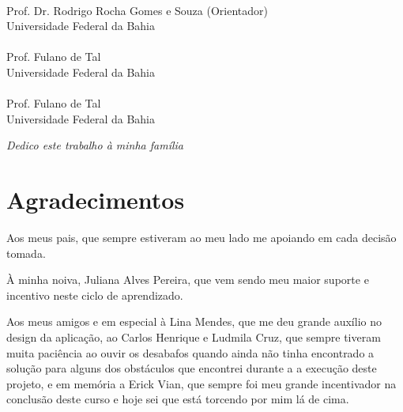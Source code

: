 \documentclass[12pt, a4paper]{report}
\begin{document}
\begin{flushright}
\begin{minipage}[l]{12cm}
\begin{center}
\uline{\hspace{10.5cm}} \\
Prof. Dr. Rodrigo Rocha Gomes e Souza (Orientador) \\ Universidade Federal da Bahia \\
\vspace{1cm}
\uline{\hspace{10.5cm}} \\
Prof. Fulano de Tal\\ Universidade Federal da Bahia \\
\vspace{1cm}
\uline{\hspace{10.5cm}} \\
Prof. Fulano de Tal \\ Universidade Federal da Bahia \\


\end{center}
\end{minipage}
\end{flushright}
\thispagestyle{empty} 

\newpage
\vspace*{21.9cm}
\begin{flushright}
\textit{Dedico este trabalho à minha família}
\end{flushright}
\thispagestyle{empty} 


\newpage
\chapter*{Agradecimentos}
\thispagestyle{empty}
Aos meus pais, que sempre estiveram ao meu lado me apoiando em cada decisão tomada.

À minha noiva, Juliana Alves Pereira, que vem sendo meu maior suporte e incentivo neste ciclo de aprendizado. 

Aos meus amigos e em especial à Lina Mendes, que me deu grande auxílio no design da aplicação, ao Carlos Henrique e Ludmila Cruz, que sempre tiveram muita paciência ao ouvir os desabafos quando ainda não tinha encontrado a solução para alguns dos obstáculos que encontrei durante a a execução deste projeto, e em memória a Erick Vian, que sempre foi meu grande incentivador na conclusão deste curso e hoje sei que está torcendo por mim lá de cima.
\end{document}
